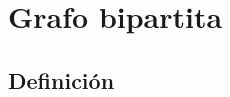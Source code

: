 \documentclass[12pt, fleqn]{article}
\begin{document}
    \section{Grafo bipartita}
        \subsection{Definición}
                    
\end{document}
